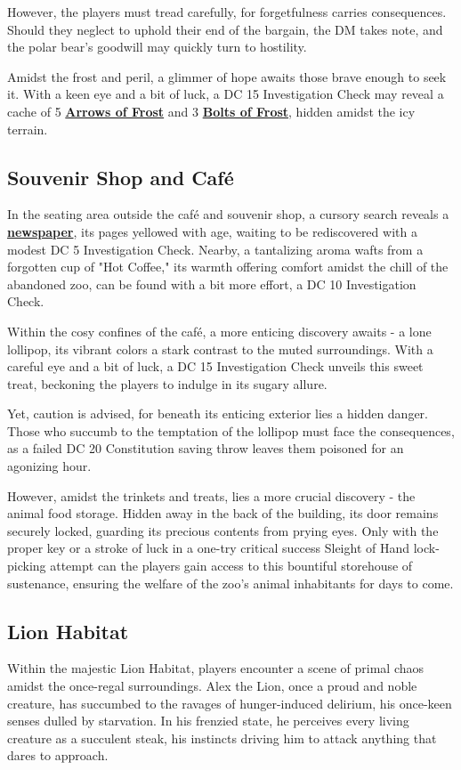 However, the players must tread carefully, for forgetfulness carries consequences. Should they neglect to uphold their end of the bargain, the DM takes note, and the polar bear's goodwill may quickly turn to hostility.

Amidst the frost and peril, a glimmer of hope awaits those brave enough to seek it. With a keen eye and a bit of luck, a DC 15 Investigation Check may reveal a cache of 5 \hyperref[sec:ArrowBoltOfFrost]{\textbf{Arrows of Frost}} and 3 \hyperref[sec:ArrowBoltOfFrost]{\textbf{Bolts of Frost}}, hidden amidst the icy terrain.
\subsection*{ Souvenir Shop and Café}
In the seating area outside the café and souvenir shop, a cursory search reveals a \hyperref[sec:CipheredNewspaper]{\textbf{newspaper}}, its pages yellowed with age, waiting to be rediscovered with a modest DC 5 Investigation Check. Nearby, a tantalizing aroma wafts from a forgotten cup of "Hot Coffee," its warmth offering comfort amidst the chill of the abandoned zoo, can be found with a bit more effort, a DC 10 Investigation Check.

Within the cosy confines of the café, a more enticing discovery awaits - a lone lollipop, its vibrant colors a stark contrast to the muted surroundings. With a careful eye and a bit of luck, a DC 15 Investigation Check unveils this sweet treat, beckoning the players to indulge in its sugary allure.

Yet, caution is advised, for beneath its enticing exterior lies a hidden danger. Those who succumb to the temptation of the lollipop must face the consequences, as a failed DC 20 Constitution saving throw leaves them poisoned for an agonizing hour.

However, amidst the trinkets and treats, lies a more crucial discovery - the animal food storage. Hidden away in the back of the building, its door remains securely locked, guarding its precious contents from prying eyes. Only with the proper key or a stroke of luck in a one-try critical success Sleight of Hand lock-picking attempt can the players gain access to this bountiful storehouse of sustenance, ensuring the welfare of the zoo's animal inhabitants for days to come.
\subsection*{ Lion Habitat}
Within the majestic Lion Habitat, players encounter a scene of primal chaos amidst the once-regal surroundings. Alex the Lion, once a proud and noble creature, has succumbed to the ravages of hunger-induced delirium, his once-keen senses dulled by starvation. In his frenzied state, he perceives every living creature as a succulent steak, his instincts driving him to attack anything that dares to approach.


